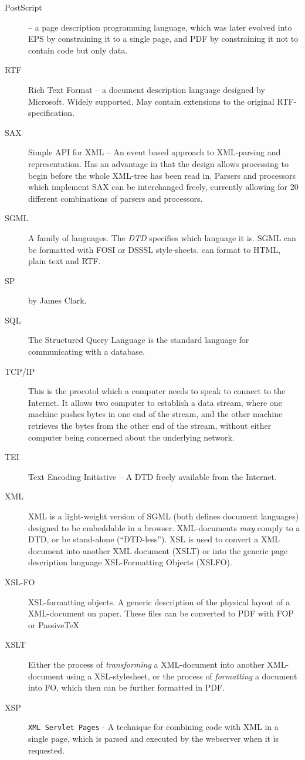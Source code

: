 \begin{description}
\item[PostScript] -- a page description programming language, which was later evolved into EPS by constraining it to a single page, and PDF by constraining it not to contain code but only data.
\item[RTF] Rich Text Format -- a document description language designed by Microsoft.  Widely supported.  May contain extensions to the original RTF-specification.
\item[SAX] Simple API for XML -- An event based approach to XML-parsing and representation.  Has an advantage in that the design allows processing to begin before the whole XML-tree has been read in.  Parsers and processors which implement SAX can be interchanged freely, currently allowing for 20 different combinations of parsers and processors.
\item[SGML] A family of languages.  The \textit{DTD} specifies which language it is.  SGML can be formatted with FOSI or DSSSL style-sheets.   can format to HTML, plain text and RTF.
\item[SP] {} by James Clark.
\item[SQL] The Structured Query Language is the standard language for communicating with a database.
\item[TCP/IP] This is the procotol which a computer needs to speak to connect to the Internet.  It allows two computer to establish a data stream, where one machine pushes bytes in one end of the stream, and the other machine retrieves the bytes from the other end of the stream, without either computer being concerned about the underlying network.
\item[TEI] Text Encoding Initiative -- A DTD freely available from the Internet.
\item[XML] XML is a light-weight version of SGML (both defines document languages) designed to be embeddable in a browser.  XML-documents \textit{may} comply to a DTD, or be stand-alone (``DTD-less'').  XSL is used to convert a XML document into another XML document (XSLT) or into the generic page description language XSL-Formatting Objects (XSLFO).
\item[XSL-FO] XSL-formatting objects.  A generic description of the physical layout of a XML-document on paper.  These files can be converted to PDF with FOP or PassiveTeX
\item[XSLT] Either the process of \textit{transforming} a XML-document into another XML-document using a XSL-stylesheet, or the process of \textit{formatting} a document into FO, which then can be further formatted in PDF.
\item[XSP] \texttt{XML Servlet Pages} - A technique for combining code with XML in a single page, which is parsed and executed by the webserver when it is requested.


\end{description}





